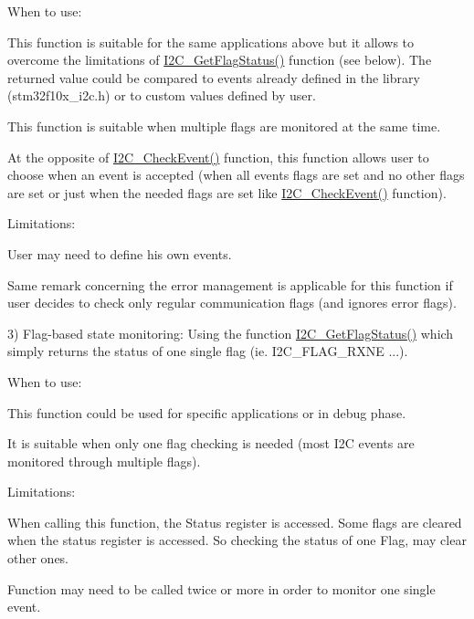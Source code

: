 When to use\+:
\begin{DoxyItemize}
\item This function is suitable for the same applications above but it allows to overcome the limitations of \hyperlink{agilefox_2library_2src_2stm32f10x__i2c_8c_a9aefe6c49ded931ae087ff44a47b87f3}{I2\+C\+\_\+\+Get\+Flag\+Status()} function (see below). The returned value could be compared to events already defined in the library (stm32f10x\+\_\+i2c.\+h) or to custom values defined by user.
\item This function is suitable when multiple flags are monitored at the same time.
\item At the opposite of \hyperlink{agilefox_2library_2src_2stm32f10x__i2c_8c_a7a2dae90ca87dd8b95fee3fb675a7bd3}{I2\+C\+\_\+\+Check\+Event()} function, this function allows user to choose when an event is accepted (when all events flags are set and no other flags are set or just when the needed flags are set like \hyperlink{agilefox_2library_2src_2stm32f10x__i2c_8c_a7a2dae90ca87dd8b95fee3fb675a7bd3}{I2\+C\+\_\+\+Check\+Event()} function).
\end{DoxyItemize}

Limitations\+:
\begin{DoxyItemize}
\item User may need to define his own events.
\item Same remark concerning the error management is applicable for this function if user decides to check only regular communication flags (and ignores error flags).
\end{DoxyItemize}

3) Flag-\/based state monitoring\+: Using the function \hyperlink{agilefox_2library_2src_2stm32f10x__i2c_8c_a9aefe6c49ded931ae087ff44a47b87f3}{I2\+C\+\_\+\+Get\+Flag\+Status()} which simply returns the status of one single flag (ie. I2\+C\+\_\+\+F\+L\+A\+G\+\_\+\+R\+X\+NE ...).
\begin{DoxyItemize}
\item When to use\+:
\begin{DoxyItemize}
\item This function could be used for specific applications or in debug phase.
\item It is suitable when only one flag checking is needed (most I2C events are monitored through multiple flags).
\end{DoxyItemize}
\item Limitations\+:
\begin{DoxyItemize}
\item When calling this function, the Status register is accessed. Some flags are cleared when the status register is accessed. So checking the status of one Flag, may clear other ones.
\item Function may need to be called twice or more in order to monitor one single event.
\end{DoxyItemize}
\end{DoxyItemize}

